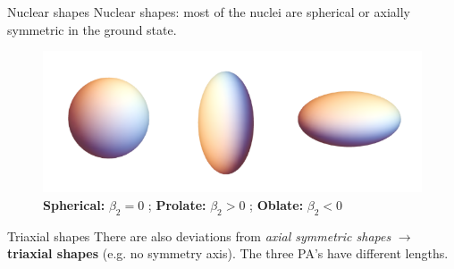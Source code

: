 \documentclass{beamer}
\begin{document}
\begin{frame}{Nuclear shapes}
Nuclear shapes: most of the nuclei are spherical or axially symmetric in the ground state.
  \begin{figure}
    \centering
    \includegraphics[scale=0.4]{figs/nuclear_shapes.png}
    \caption{\textbf{Spherical:} $\beta_2=0$ ; \textbf{Prolate:} $\beta_2>0$ ; \textbf{Oblate:} $\beta_2<0$}
  \end{figure}
  \begin{exampleblock}{Triaxial shapes}
       There are also deviations from \emph{axial symmetric shapes} $\to$ \textbf{triaxial shapes} (e.g. no symmetry axis). The three PA's have different lengths.
  \end{exampleblock}
\end{frame}

\end{document}
